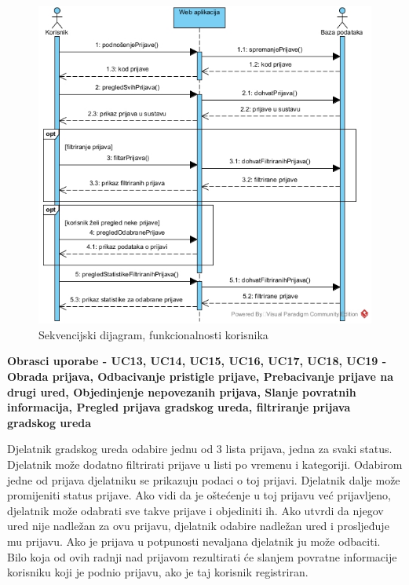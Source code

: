 				\begin{figure}[H]
					\includegraphics[width=\textwidth]{slike/Funkcionalnosti_korisnikaSD.jpg} %
					\caption{Sekvencijski dijagram, funkcionalnosti korisnika}
					\label{fig:sekvencijskiDijagram2} %
				\end{figure}
				\eject
				
				\textbf{Obrasci uporabe - UC13, UC14, UC15, UC16, UC17, UC18, UC19 - Obrada prijava, Odbacivanje pristigle prijave, Prebacivanje prijave na drugi ured, Objedinjenje nepovezanih prijava, Slanje povratnih informacija, Pregled prijava gradskog ureda, filtriranje prijava gradskog ureda}
				
				Djelatnik gradskog ureda odabire jednu od 3 lista prijava, jedna za svaki status. Djelatnik može dodatno filtrirati prijave u listi po vremenu i kategoriji. Odabirom jedne od prijava djelatniku se prikazuju podaci o toj prijavi. Djelatnik dalje može promijeniti status prijave. Ako vidi da je oštećenje u toj prijavu već prijavljeno, djelatnik može odabrati sve takve prijave i objediniti ih. Ako utvrdi da njegov ured nije nadležan za ovu prijavu, djelatnik odabire nadležan ured i prosljeđuje mu prijavu. Ako je prijava u potpunosti nevaljana djelatnik ju može odbaciti. Bilo koja od ovih radnji nad prijavom rezultirati će slanjem povratne informacije korisniku koji je podnio prijavu, ako je taj korisnik registriran.
				
